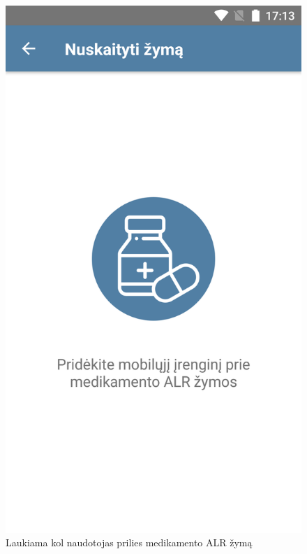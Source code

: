 \documentclass{VUMIFPSbakalaurinis}
\begin{document}
\begin{figure}[H]
    \centering
    \includegraphics[scale=0.15]{images/prototype-2}
    \caption{Laukiama kol naudotojas prilies medikamento ALR žymą} 
\end{figure}
\end{document}
